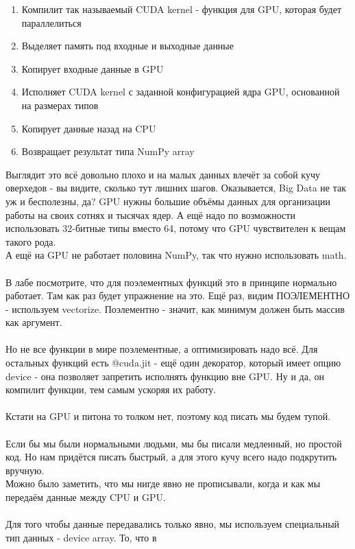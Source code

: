 \documentclass[14pt]{extarticle}
\begin{document}
\begin{enumerate}
    \item Компилит так называемый CUDA kernel - 
    функция для GPU, которая будет параллелиться
    \item Выделяет память под входные и выходные данные
    \item Копирует входные данные в GPU
    \item Исполняет CUDA kernel 
    с заданной конфигурацией ядра GPU, основанной
    на размерах типов 
    \item Копирует данные назад на CPU 
    \item Возвращает результат типа NumPy array 
\end{enumerate}
Выглядит это всё довольно плохо и на малых данных 
влечёт за собой кучу оверхедов - вы видите, 
сколько тут лишних шагов. Оказывается, 
Big Data не так уж и бесполезны, да? GPU нужны
большие объёмы данных для организации работы
на своих сотнях и тысячах ядер. А ещё надо по 
возможности использовать 32-битные типы вместо 64,
потому что GPU чувствителен к вещам такого рода.\\
А ещё на GPU не работает половина NumPy, так что
нужно использовать math.\\\\
В лабе посмотрите, что для поэлементных функций это
в принципе нормально работает. Там как раз будет 
упражнение на это. Ещё раз, видим ПОЭЛЕМЕНТНО - 
используем vectorize. Поэлементно - значит, как минимум должен 
быть массив как аргумент.
\\\\
Но не все функции
в мире поэлементные, а оптимизировать надо всё. Для остальных 
функций есть @cuda.jit - ещё один декоратор, который имеет 
опцию device - она позволяет запретить исполнять 
функцию вне GPU. Ну и да, он компилит функции, 
тем самым ускоряя их работу. 
\\\\Кстати на GPU и 
питона то толком нет, поэтому код писать мы будем 
тупой.\\\\
Если бы мы были нормальными людьми, мы бы 
писали медленный, но простой код. Но нам придётся 
писать быстрый, а для этого кучу всего надо подкрутить
вручную.\\
Можно было заметить, что мы нигде явно не прописывали,
когда и как мы передаём данные между CPU и GPU. \\\\
Для того чтобы 
данные передавались только явно, 
мы используем специальный тип данных - device array. То, что в 
\end{document}
